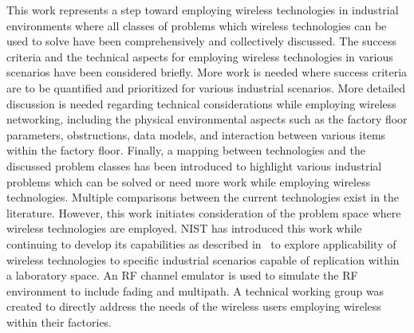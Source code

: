     This work represents a step toward employing wireless technologies in industrial environments where all classes of problems which wireless technologies can be used to solve have been comprehensively and collectively discussed. The success criteria and the technical aspects for employing wireless technologies in various scenarios have been considered briefly. More work is needed where success criteria are to be quantified and prioritized for various industrial scenarios. More detailed discussion is needed regarding technical considerations while employing wireless networking, including the physical environmental aspects such as the factory floor parameters, obstructions, data models, and interaction between various items within the factory floor. Finally, a mapping between technologies and the discussed problem classes has been introduced to highlight various industrial problems which can be solved or need more work while employing wireless technologies. Multiple comparisons between the current technologies exist in the literature. However, this work initiates consideration of the problem space where wireless technologies are employed. NIST has introduced this work while continuing to develop its capabilities as described in~\cite{candell2015measuring} to explore applicability of wireless technologies to specific industrial scenarios capable of replication within a laboratory space. An RF channel emulator is used to simulate the RF environment to include fading and multipath. A technical working group was created to directly address the needs of the wireless users employing wireless within their factories.



